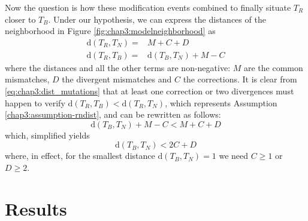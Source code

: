 Now the question is how these modification events combined to finally
situate $T_R$ closer to $T_B$. Under our hypothesis, we can express
the distances of the neighborhood in Figure
\ref{fig:chap3:modelneighborhood} as
\begin{equation}
  \begin{array}{cl}
    \label{eq:chap3:dist_mutations}
    \mathrm{d}(T_R,T_N) = & M + C + D \\
    \mathrm{d}(T_R,T_B) = & \mathrm{d}(T_B,T_N) + M - C
  \end{array}
\end{equation}
where the distances and all the other terms are non-negative: $M$ are
the common mismatches, $D$ the divergent mismatches and $C$ the
corrections. It is clear from \eqref{eq:chap3:dist_mutations} that at
least one correction or two divergences must happen to verify
$\mathrm{d}(T_R,T_B) < \mathrm{d}(T_R,T_N)$, which represents
Assumption \ref{chap3:assumption-rndist}, and can be rewritten as
follows:
\begin{equation}
  \label{eq:chap3:rndist_mutations}
  \mathrm{d}(T_B,T_N) + M - C < M + C + D
\end{equation}
which, simplified yields
\begin{equation}
  \label{eq:chap3:rndist_mutations_simp}
  \mathrm{d}(T_B,T_N) < 2C + D
\end{equation}
where, in effect, for the smallest distance $\mathrm{d}(T_B,T_N)=1$ we
need $C\ge1$ or $D\ge2$.



\chapter{Results}
